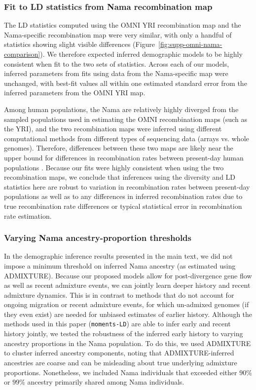 \documentclass[]{article}
\begin{document}
\subsubsection{Fit to LD statistics from Nama recombination map}

The LD statistics computed using the OMNI YRI recombination map and the
Nama-specific recombination map were very similar, with only a handful of
statistics showing slight visible differences
(Figure~\ref{fig:supp-omni-nama-comparison}). We therefore expected inferred
demographic models to be highly consistent when fit to the two sets of
statistics. Across each of our models, inferred parameters from fits using data
from the Nama-specific map were unchanged, with best-fit values all within one
estimated standard error from the inferred parameters from the OMNI YRI map.

Among human populations, the Nama are relatively highly diverged from the
sampled populations used in estimating the OMNI recombination maps (such as the
YRI), and the two recombination maps were inferred using different
computational methods from different types of sequencing data (arrays vs. whole
genomes). Therefore, differences between these two maps are likely near the
upper bound for differences in recombination rates between present-day human
populations \citep{Van_Eeden2022-od}. Because our fits were highly consistent
when using the two recombination maps, we conclude that inferences using the
diversity and LD statistics here are robust to variation in recombination rates
between present-day populations as well as to any differences in inferred
recombination rates due to true recombination rate differences or typical
statistical error in recombination rate estimation.

\subsubsection{Varying Nama ancestry-proportion thresholds}

In the demographic inference results presented in the main text, we did not
impose a minimum threshold on inferred Nama ancestry (as estimated using
ADMIXTURE). Because our proposed models allow for post-divergence gene flow as
well as recent admixture events, we can jointly learn deeper history and recent
admixture dynamics. This is in contrast to methods that do not account for
ongoing migration or recent admixture events, for which un-admixed genomes (if
they even exist) are needed for unbiased estimates of earlier history.
Although the methods used in this paper (\texttt{moments-LD}) are able to infer
early and recent history jointly, we tested the robustness of the inferred
early history to varying ancestry proportions in the Nama population. To do
this, we used ADMIXTURE to cluster inferred ancestry components, noting that
ADMIXTURE-inferred ancestries are coarse and can be misleading about true
underlying admixture proportions. Nonetheless, we included Nama individuals
that exceeded either $90\%$ or $99\%$ ancestry primarily shared among Nama
individuals.
\end{document}
